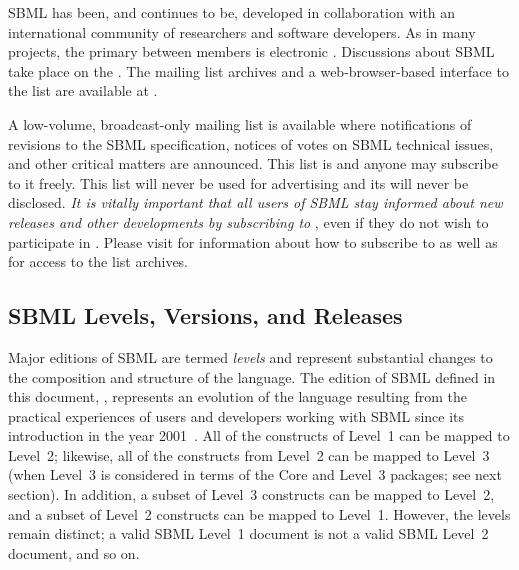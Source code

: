 SBML has been, and continues to be, developed in collaboration
with an international community of researchers and software
developers.  As in many projects, the primary  between members is electronic .
Discussions about SBML take place on the 
.
The mailing list archives and a web-browser-based interface to the
list are available at .

A low-volume, broadcast-only mailing list is
available where notifications of revisions to the SBML
speci\-fication, notices of votes on SBML technical issues, and
other critical matters are announced.  This list is
and anyone may subscribe to it freely.  This list will never be
used for advertising and its  will never be
disclosed.  \emph{It is vitally important that all users of SBML
  stay informed about new releases and other developments by
  subscribing to
  },
even if they do not wish to participate in .
Please visit
for information about how to subscribe to  as
well as for access to the list archives.


\subsection{SBML Levels, Versions, and Releases}
\label{sec:levels-versions-releases}

Major editions of SBML are termed \emph{levels} and represent
substantial changes to the composition and structure of the
language.  The edition of SBML defined in this document,
\sbmlthree, represents an evolution of the language resulting from
the practical experiences of users and developers working with
SBML since its introduction in the year
2001~\citep{hucka:2001,hucka:2003}.  All of the constructs of
Level~1 can be mapped to Level~2; likewise, all of the constructs
from Level~2 can be mapped to Level~3 (when Level~3 is considered
in terms of the Core and Level~3 packages; see next section).  In
addition, a subset of Level~3 constructs can be mapped to Level~2,
and a subset of Level~2 constructs can be mapped to Level~1.
However, the levels remain distinct; a valid SBML Level~1 document
is not a valid SBML Level~2 document, and so on.

